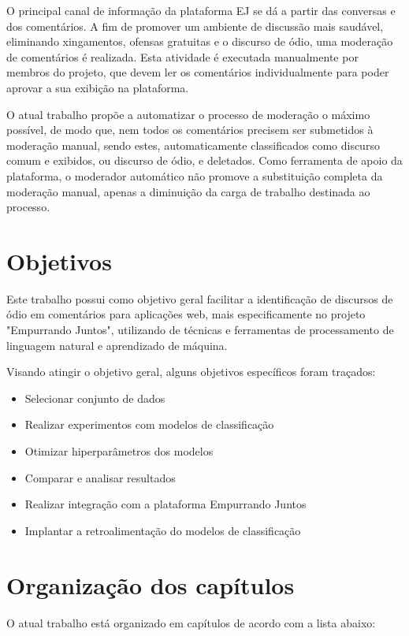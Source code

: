 O principal canal de informação da plataforma EJ se dá a partir das conversas e dos comentários. A fim de promover um ambiente de discussão mais saudável, eliminando xingamentos, ofensas gratuitas e o discurso de ódio, uma moderação de comentários é realizada. Esta atividade é executada manualmente por membros do projeto, que devem ler os comentários individualmente para poder aprovar a sua exibição na plataforma.

O atual trabalho propõe a automatizar o processo de moderação o máximo possível, de modo que, nem todos os comentários precisem ser submetidos à moderação manual, sendo estes, automaticamente classificados como discurso comum e exibidos, ou discurso de ódio, e deletados. Como ferramenta de apoio da plataforma, o moderador automático não promove a substituição completa da moderação manual, apenas a diminuição da carga de trabalho destinada ao processo.

\section[Objetivos]{Objetivos}

Este trabalho possui como objetivo geral facilitar a identificação de discursos de ódio em comentários para aplicações web, mais especificamente no projeto "Empurrando Juntos", utilizando de técnicas e ferramentas de processamento de linguagem natural e aprendizado de máquina.

Visando atingir o objetivo geral, alguns objetivos específicos foram traçados:

\begin{itemize}
\item Selecionar conjunto de dados
\item Realizar experimentos com modelos de classificação
\item Otimizar hiperparâmetros dos modelos
\item Comparar e analisar resultados
\item Realizar integração com a plataforma Empurrando Juntos
\item Implantar a retroalimentação do modelos de classificação
\end{itemize}

\section[Organização dos capítulos]{Organização dos capítulos}

O atual trabalho está organizado em capítulos de acordo com a lista abaixo:

